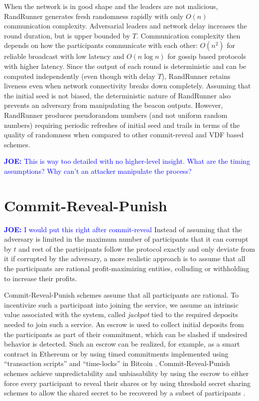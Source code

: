 \documentclass[letterpaper,twocolumn,10pt]{article}
\theoremstyle{definition}
\theoremstyle{remark}
\newcommand{\joenote}[1]{\textcolor{blue}{\textbf{JOE:} #1}}
\begin{document}
When the network is in good shape and the leaders are not malicious, RandRunner generates fresh randomness rapidly with only $O(n)$ communication complexity. Adversarial leaders and network delay increases the round duration, but is upper bounded by $T$. Communication complexity then depends on how the participants communicate with each other: $O(n^2)$ for reliable broadcast with low latency and $O(n \log n)$ for gossip based protocols with higher latency. Since the output of each round is deterministic and can be computed independently (even though with delay $T$), RandRunner retains liveness even when network connectivity breaks down completely. Assuming that the initial seed is not biased, the deterministic nature of RandRunner also prevents an adversary from manipulating the beacon outputs. However, RandRunner produces pseudorandom numbers (and not uniform random numbers) requiring periodic refreshes of initial seed and trails in terms of the quality of randomness when compared to other commit-reveal and VDF based schemes.

\joenote{This is way too detailed with no higher-level insight. What are the timing assumptions? Why can't an attacker manipulate the process?}

\section{Commit-Reveal-Punish}
\joenote{I would put this right after commit-reveal}
\label{section:commit-reveal-punish}
Instead of assuming that the adversary is limited in the maximum number of participants  that it can corrupt by $t$ and rest of the participants follow the protocol exactly and only deviate from it if corrupted by the adversary, a more realistic approach is to assume that all the participants are rational profit-maximizing entities, colluding or withholding to increase their profits. 

Commit-Reveal-Punish schemes assume that all participants are rational. To incentivize such a participant into joining the service, we assume an intrinsic value associated with the system, called \emph{jackpot} tied to the required deposits needed to join such a service. An escrow is used to collect initial deposits from the participants as part of their commitment, which can be slashed if undesired behavior is detected. Such an escrow can be realized, for example, as a smart contract in Ethereum \cite{david2020economically} or by using timed commitments implemented using ``transaction scripts'' and ``time-locks'' in Bitcoin \cite{andrychowicz2014secure}.  Commit-Reveal-Punish schemes achieve unpredictability and unbiasability by using the escrow to either force every participant to reveal their shares \cite{youcai2017randao, andrychowicz2014secure} or by using threshold secret sharing schemes to allow the shared secret to be recovered by a subset of participants \cite{david2020economically}. 
\end{document}
